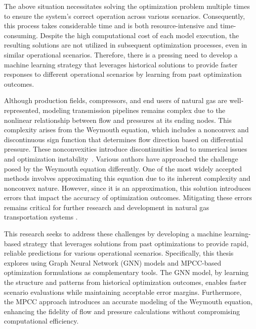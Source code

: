 The above situation necessitates solving the optimization problem multiple times to ensure the system's correct operation across various scenarios. Consequently, this process takes considerable time and is both resource-intensive and time-consuming. Despite the high computational cost of each model execution, the resulting solutions are not utilized in subsequent optimization processes, even in similar operational scenarios. Therefore, there is a pressing need to develop a machine learning strategy that leverages historical solutions to provide faster responses to different operational scenarios by learning from past optimization outcomes.

Although production fields, compressors, and end users of natural gas are well-represented, modeling transmission pipelines remains complex due to the nonlinear relationship between flow and pressures at its ending nodes. This complexity arises from the Weymouth equation, which includes a nonconvex and discontinuous sign function that determines flow direction based on differential pressure. These nonconvexities introduce discontinuities lead to numerical issues and optimization instability~\cite{YANG2020106023, JIANG2021106460}. Various authors have approached the challenge posed by the Weymouth equation differently. One of the most widely accepted methods involves approximating this equation due to its inherent complexity and nonconvex nature. However, since it is an approximation, this solution introduces errors that impact the accuracy of optimization outcomes. Mitigating these errors remains critical for further research and development in natural gas transportation systems \cite{review}.


This research seeks to address these challenges by developing a machine learning-based strategy that leverages solutions from past optimizations to provide rapid, reliable predictions for various operational scenarios. Specifically, this thesis explores using Graph Neural Network (GNN) models and MPCC-based optimization formulations as complementary tools. The GNN model, by learning the structure and patterns from historical optimization outcomes, enables faster scenario evaluations while maintaining acceptable error margins. Furthermore, the MPCC approach introduces an accurate modeling of the Weymouth equation, enhancing the fidelity of flow and pressure calculations without compromising computational efficiency.





